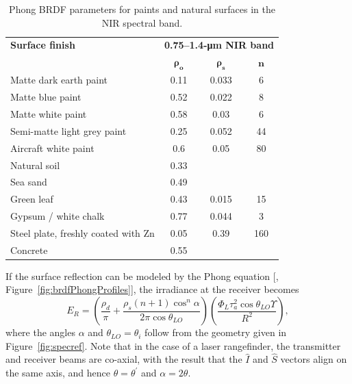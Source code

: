 \begin{table}[tb]
\centering
\caption{Phong BRDF parameters for paints and natural surfaces in the NIR spectral band.\label{brdftab}}
{\small
\begin{tabular}{|l|c|c|c|}
\hline
\textbf{Surface finish} &\multicolumn{3}{c|}{\textbf{0.75--1.4-\si{\micro\metre}{} NIR band}} \\
\cline{2-4}
 & $\bm{ \rho_o}$& $\bm{\rho_s}$ & $\bm{n}$ \\
\hline
Matte dark earth paint & 0.11 & 0.033 & 6\\
Matte blue paint & 0.52 & 0.022 & 8\\
Matte white paint & 0.58 & 0.03 & 6\\
Semi-matte light grey paint & 0.25 & 0.052 & 44\\
Aircraft white paint & 0.6 & 0.05 & 80 \\
\hline
Natural soil & 0.33 & & \\
Sea sand & 0.49 && \\
Green leaf & 0.43 & 0.015 & 15\\
Gypsum / white chalk & 0.77 & 0.044 & 3\\
Steel plate, freshly coated with Zn& 0.05 & 0.39 & 160\\
Concrete & 0.55 & & \\
\hline
\end{tabular}
}
\end{table}


\FloatBarrier


If the surface reflection can be modeled by the Phong equation [, Figure~\ref{fig:brdfPhongProfiles}], the irradiance at the receiver becomes
\begin{equation}
E_R = 
\left(
\frac{\rho_d}{\pi} + \frac{\rho_s(n+1)\cos^n\alpha}{2\pi\cos\theta_{LO}}
\right)
\left(\frac{
\Phi_L \tau^2_{a} \cos\theta_{LO}\Upsilon}{ R^2 } %
\right),
\label{lrfi4}
\end{equation}
where the angles $\alpha$ and $\theta_{LO}=\theta_i$ follow from the geometry given in Figure~\ref{fig:specref}. Note that in the case of a laser rangefinder, the transmitter and receiver beams are co-axial, with the result that the $\widehat{I}$ and $\widehat{S}$ vectors align on the same axis, and hence $\theta=\theta^\prime$ and $\alpha=2\theta$.

